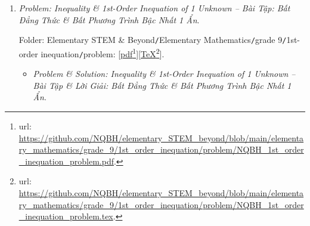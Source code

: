 \documentclass[12pt]{article}
\begin{document}
\begin{enumerate}
\begin{itemize}
		Folder: {\sf Elementary STEM \& Beyond{\tt/}Elementary Mathematics{\tt/}grade 9{\tt/}system of 1st-order equations{\tt/}solution}: [\href{https://github.com/NQBH/elementary_STEM_beyond/blob/main/elementary_mathematics/grade_9/system_1st_order_equations/solution/NQBH_system_1st_order_equations_solution.pdf}{pdf}\footnote{{\sc url}: \url{https://github.com/NQBH/elementary_STEM_beyond/blob/main/elementary_mathematics/grade_9/system_1st_order_equations/solution/NQBH_system_1st_order_equations_solution.pdf}.}][\href{https://github.com/NQBH/elementary_STEM_beyond/blob/main/elementary_mathematics/grade_9/system_1st_order_equations/solution/NQBH_system_1st_order_equations_solution.tex}{\TeX}\footnote{{\sc url}: \url{https://github.com/NQBH/elementary_STEM_beyond/blob/main/elementary_mathematics/grade_9/system_1st_order_equations/solution/NQBH_system_1st_order_equations_solution.tex}.}].
	\end{itemize}
	\item {\it Problem: Inequality \& 1st-Order Inequation of 1 Unknown -- Bài Tập: Bất Đẳng Thức \& Bất Phương Trình Bậc Nhất 1 Ẩn}.
	
	Folder: {\sf Elementary STEM \& Beyond{\tt/}Elementary Mathematics{\tt/}grade 9{\tt/}1st-order inequation{\tt/}problem}: [\href{https://github.com/NQBH/elementary_STEM_beyond/blob/main/elementary_mathematics/grade_9/1st_order_inequation/problem/NQBH_1st_order_inequation_problem.pdf}{pdf}\footnote{{\sc url}: \url{https://github.com/NQBH/elementary_STEM_beyond/blob/main/elementary_mathematics/grade_9/1st_order_inequation/problem/NQBH_1st_order_inequation_problem.pdf}.}][\href{https://github.com/NQBH/elementary_STEM_beyond/blob/main/elementary_mathematics/grade_9/1st_order_inequation/problem/NQBH_1st_order_inequation_problem.tex}{\TeX}\footnote{{\sc url}: \url{https://github.com/NQBH/elementary_STEM_beyond/blob/main/elementary_mathematics/grade_9/1st_order_inequation/problem/NQBH_1st_order_inequation_problem.tex}.}].
	\begin{itemize}
		\item {\it Problem \& Solution: Inequality \& 1st-Order Inequation of 1 Unknown -- Bài Tập \& Lời Giải: Bất Đẳng Thức \& Bất Phương Trình Bậc Nhất 1 Ẩn}.
		

\end{itemize}
\end{enumerate}
\end{document}
